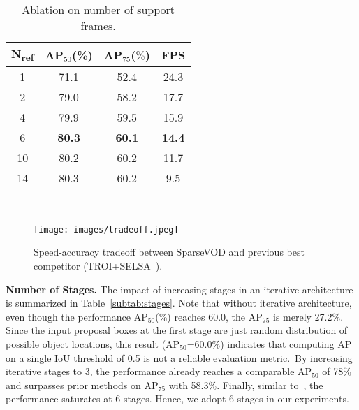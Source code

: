 \documentclass{bmvc2k}
\begin{document}
\begin{minipage}{\linewidth}

  \begin{minipage}{0.35\linewidth}
  \begin{table}[H]
  \hspace{-10pt}
    \small
        \begin{tabular}{c|ccc}
            \toprule
            N\textsubscript{ref} & AP$_{50}$(\%) &  AP$_{75}$($\%$)  & FPS \\
            \hline
            1 & 71.1 & 52.4 & 24.3\\
            2 & 79.0 & 58.2 & 17.7\\
            4 & 79.9 & 59.5 & 15.9\\
            {6} & \textbf{80.3} & \textbf{60.1} & \textbf{14.4}\\
            10 & 80.2 & 60.2 & 11.7\\
            14 & 80.3 & 60.2 & 9.5\\
            \bottomrule
        \end{tabular}\\ 
        \vspace{-5pt}
          \caption{Ablation on number of support frames.}
          \label{tab:ablation_support_frames}
      \end{table}
  \end{minipage}
  \hspace{0.03\linewidth}
  \begin{minipage}{0.55\linewidth}
        \begin{figure}[H]
        \texttt{[image: images/tradeoff.jpeg]}
        \vspace{-10pt}
        \caption{Speed-accuracy tradeoff between SparseVOD and previous best competitor (TROI+SELSA~\cite{gong2021temporal}).}
        \label{fig:tradeoff}
      \end{figure}
  \end{minipage}
\end{minipage}


\vspace{5pt}
\noindent \textbf{Number of Stages.}
The impact of increasing stages in an iterative architecture is summarized in Table~\ref{subtab:stages}. Note that without iterative architecture, even though the performance AP$_{50}$(\%) reaches 60.0, the AP$_{75}$ is merely 27.2\%. Since the input proposal boxes at the first stage are just random distribution of possible object locations, this result (AP$_{50}$=60.0\%) indicates that computing AP on a single IoU threshold of 0.5 is not a reliable evaluation metric.~By increasing iterative stages to 3, the performance already reaches a comparable AP$_{50}$ of 78\% and surpasses prior methods on AP$_{75}$ with 58.3\%. Finally, similar to~\cite{sun2021sparse}, the performance saturates at 6 stages. Hence, we adopt 6 stages in our experiments.
\end{document}

